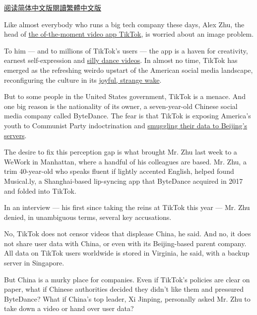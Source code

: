 \href{https://cn.nytimes.com/technology/20191118/tiktok-alex-zhu-interview/}{阅读简体中文版}\href{https://cn.nytimes.com/technology/20191118/tiktok-alex-zhu-interview/zh-hant/}{閱讀繁體中文版}

Like almost everybody who runs a big tech company these days, Alex Zhu,
the head of
\href{https://www.nytimes.com/2019/03/10/style/what-is-tik-tok.html}{the
of-the-moment video app TikTok}, is worried about an image problem.

To him --- and to millions of TikTok's users --- the app is a haven for
creativity, earnest self-expression and
\href{https://www.nytimes.com/2019/10/19/style/high-school-tiktok-clubs.html}{silly
dance videos}. In almost no time, TikTok has emerged as the refreshing
weirdo upstart of the American social media landscape, reconfiguring the
culture in its
\href{https://www.nytimes.com/interactive/2019/10/10/arts/TIK-TOK.html}{joyful,
strange wake}.

But to some people in the United States government, TikTok is a menace.
And one big reason is the nationality of its owner, a seven-year-old
Chinese social media company called ByteDance. The fear is that TikTok
is exposing America's youth to Communist Party indoctrination and
\href{https://www.blackburn.senate.gov/blackburn-tiktok-you-are-chinas-best-detective}{smuggling
their data to Beijing's servers}.

The desire to fix this perception gap is what brought Mr. Zhu last week
to a WeWork in Manhattan, where a handful of his colleagues are based.
Mr. Zhu, a trim 40-year-old who speaks fluent if lightly accented
English, helped found Musical.ly, a Shanghai-based lip-syncing app that
ByteDance acquired in 2017 and folded into TikTok.

In an interview --- his first since taking the reins at TikTok this year
--- Mr. Zhu denied, in unambiguous terms, several key accusations.

No, TikTok does not censor videos that displease China, he said. And no,
it does not share user data with China, or even with its Beijing-based
parent company. All data on TikTok users worldwide is stored in
Virginia, he said, with a backup server in Singapore.

But China is a murky place for companies. Even if TikTok's policies are
clear on paper, what if Chinese authorities decided they didn't like
them and pressured ByteDance? What if China's top leader, Xi Jinping,
personally asked Mr. Zhu to take down a video or hand over user data?

